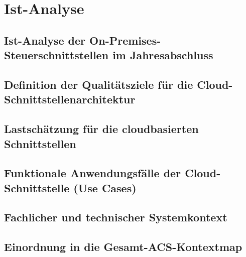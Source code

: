 \chapter{Ist-Analyse}

\section{Ist-Analyse der On-Premises-Steuerschnittstellen im Jahresabschluss}

\section{Definition der Qualitätsziele für die Cloud-Schnittstellenarchitektur}

\section{Lastschätzung für die cloudbasierten Schnittstellen}

\section{Funktionale Anwendungsfälle der Cloud-Schnittstelle (Use Cases)}

\section{Fachlicher und technischer Systemkontext}

\section{Einordnung in die Gesamt-ACS-Kontextmap}
